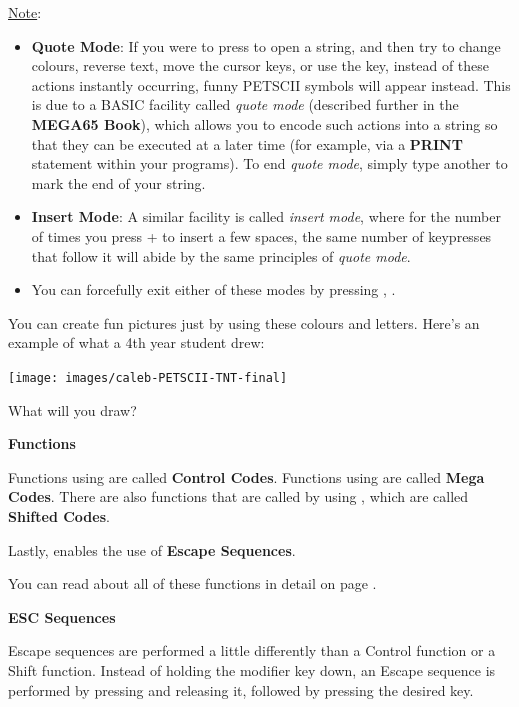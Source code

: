 \underline{Note}:
\begin{itemize}
  \item {\bf Quote Mode}: If you were to press  to open a string, and then try to change
colours, reverse text, move the cursor keys, or use the  key, instead
of these actions instantly occurring, funny PETSCII symbols will appear instead. This is
due to a BASIC facility called {\it quote mode} (described further in the \textbf{MEGA65 Book}),
which allows you to encode such actions into a string so that they can be executed at a later
time (for example, via a {\bf PRINT} statement within your programs). To end {\it quote mode}, simply
type another  to mark the end of your string.
  \item {\bf Insert Mode}: A similar facility is called
{\it insert mode}, where for the number of times you press  + 
to insert a few spaces, the same number of keypresses that follow it will abide by the same
principles of {\it quote mode}.
  \item You can forcefully exit either of these modes by pressing , .
\end{itemize}

\needspace{4cm}
You can create fun pictures just by using these colours and letters. Here's an example of what a 4th year student drew:

\begin{center}
\texttt{[image: images/caleb-PETSCII-TNT-final]}
\end{center}

What will you draw?

\needspace{2cm}
\textbf{Functions}

Functions using  are called \textbf{Control Codes}.
Functions using \megasymbolkey are called \textbf{Mega Codes}. There are also functions that are called by using , which are called \textbf{Shifted Codes}.

Lastly,  enables the use of \textbf{Escape Sequences}.

You can read about all of these functions in detail on page \pageref{appendix:controlcodes}.

\needspace{2cm}
\textbf{ESC Sequences}

Escape sequences are performed a little differently than a Control function or a Shift function. Instead of holding the modifier key down, an Escape sequence is performed by pressing  and releasing it, followed by pressing the desired key.

